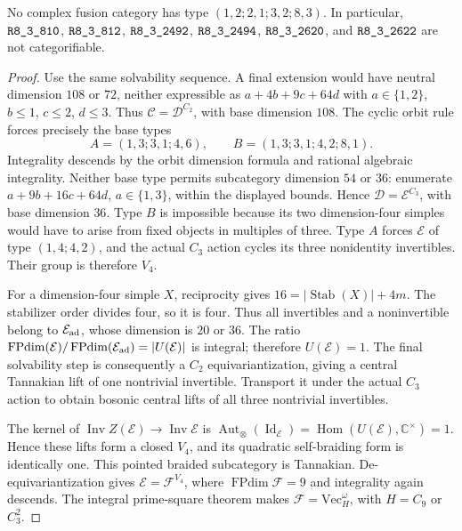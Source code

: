 \begin{theorem}\label{thm:m3-dimension216}
No complex fusion category has type $(1,2;2,1;3,2;8,3)$.
In particular, $\sha{R8_3_810}$, $\sha{R8_3_812}$, $\sha{R8_3_2492}$,
$\sha{R8_3_2494}$, $\sha{R8_3_2620}$, and $\sha{R8_3_2622}$ are not categorifiable.
\end{theorem}
\begin{proof}
Use the same solvability sequence. A final extension would have neutral
dimension $108$ or $72$, neither expressible as $a+4b+9c+64d$ with
$a\in\{1,2\}$, $b\le1$, $c\le2$, $d\le3$. Thus
$\mathcal C=\mathcal D^{C_2}$, with base dimension $108$.
The cyclic orbit rule forces precisely the base types
\[
 A=(1,3;3,1;4,6),\qquad B=(1,3;3,1;4,2;8,1).
\]
Integrality descends by the orbit dimension formula and rational
algebraic integrality. Neither base type permits subcategory dimension
$54$ or $36$: enumerate $a+9b+16c+64d$, $a\in\{1,3\}$, within the
displayed bounds. Hence $\mathcal D=\mathcal E^{C_3}$, with base
dimension $36$. Type $B$ is impossible because its two dimension-four
simples would have to arise from fixed objects in multiples of three.
Type $A$ forces $\mathcal E$ of type $(1,4;4,2)$, and the actual
$C_3$ action cycles its three nonidentity invertibles. Their group is
therefore $V_4$.

For a dimension-four simple $X$, reciprocity gives
$16=|\operatorname{Stab}(X)|+4m$. The stabilizer order divides four,
so it is four. Thus all invertibles and a noninvertible belong to
$\mathcal E_{\rm ad}$, whose dimension is $20$ or $36$.
The ratio $\operatorname{FPdim}(\mathcal E)/
\operatorname{FPdim}(\mathcal E_{\rm ad})=|U(\mathcal E)|$ is integral;
therefore $U(\mathcal E)=1$.
The final solvability step is consequently a $C_2$ equivariantization,
giving a central Tannakian lift of one nontrivial invertible. Transport
it under the actual $C_3$ action to obtain bosonic central lifts of all
three nontrivial invertibles.

The kernel of $\operatorname{Inv}Z(\mathcal E)\to
\operatorname{Inv}\mathcal E$ is
$\operatorname{Aut}_{\otimes}(\operatorname{Id}_{\mathcal E})
=\operatorname{Hom}(U(\mathcal E),\mathbb C^\times)=1$.
Hence these lifts form a closed $V_4$, and its quadratic self-braiding
form is identically one. This pointed braided subcategory is Tannakian.
De-equivariantization gives $\mathcal E=\mathcal F^{V_4}$, where
$\operatorname{FPdim}\mathcal F=9$ and integrality again descends.
The integral prime-square theorem \cite{ENO,EGNO} makes
$\mathcal F=\mathrm{Vec}_H^\omega$, with $H=C_9$ or $C_3^2$.


\end{proof}
